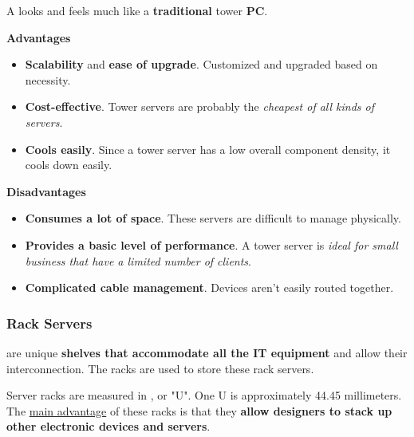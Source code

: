 A  looks and feels much like a \textbf{traditional} tower \textbf{PC}.

\begin{flushleft}
    \textcolor{Green3}{ \textbf{Advantages}}
\end{flushleft}
\begin{itemize}[label=]
    \item \textbf{Scalability} and \textbf{ease of upgrade}. Customized and upgraded based on necessity.

    \item \textbf{Cost-effective}. Tower servers are probably the \emph{cheapest of all kinds of servers}.

    \item \textbf{Cools easily}. Since a tower server has a low overall component density, it cools down easily.
\end{itemize}

\begin{flushleft}
    \textcolor{Red2}{ \textbf{Disadvantages}}
\end{flushleft}
\begin{itemize}[label=]
    \item \textbf{Consumes a lot of space}. These servers are difficult to manage physically.

    \item \textbf{Provides a basic level of performance}. A tower server is \emph{ideal for small business that have a limited number of clients}.

    \item \textbf{Complicated cable management}. Devices aren't easily routed together.
\end{itemize}

\longline

\subsubsection*{Rack Servers}

 are unique \textbf{shelves that accommodate all the IT equipment} and allow their interconnection. The racks are used to store these rack servers.

\highspace
Server racks are measured in , or "U". One U is approximately 44.45 millimeters. The \underline{main advantage} of these racks is that they \textbf{allow designers to stack up other electronic devices and servers}.

